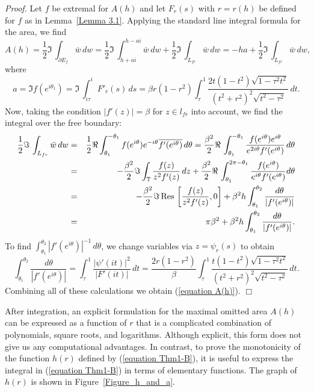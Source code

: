 \documentclass[mn,a4paper,fleqn]{w-art}
\newcommand{\be}{\begin{equation}}
\newcommand{\ee}{\end{equation}}
\newcommand{\T}{{\mathbb T}}
\begin{document}
{{\textit{Proof.}} Let $f$ be extremal for $A(h)$ and let $F_r(s)$
with $r=r(h)$ be defined for $f$ as in Lemma~\ref{Lemma 3.1}.
Applying the standard line integral formula for the area, we find  %
$$  %
A(h)=\frac12 \Im\,\int_{\partial E_f} \bar w\,dw =\frac12 \Im\,
\int_{h+ai}^{h-ai}\bar w\,dw +\frac12 \Im\, \int_{L_{fr}}\bar
w\,dw
 = -ha + \frac12 \Im\, \int_{L_{fr}}\bar w\,dw ,
$$  %
 where %
\be  \label{equation a}  %
a=\Im f(e^{i\theta_1})=\Im\, \int_{i\tau}^i F'_r(s)\, ds = \beta
r(1-r^2) \int_{\tau}^1 \frac{2t(1-t^2)\sqrt{1-\tau^2 t^2
}}{(t^2+r^2)^2\sqrt{t^2-\tau^2 }} \, dt.  %
\ee  %
Now, taking the condition $|f'(z)|=\beta$ for $z\in l_{fr}$ into
account, we find the integral over the free boundary:
\begin{eqnarray*}
\frac12 \Im\, \int_{L_{fr}}\bar w\,dw &=& \frac12 \Re
\int_{\theta_1}^{-\theta_1} f(e^{i\theta})e^{-i\theta}
{\overline{f'(e^{i\theta})}}\,d\theta = \frac{\beta^2}{2}
\Re\,\int _{\theta_1}^{-\theta_1}\frac{f(e^{i\theta})e^{i\theta}}{e^{2i\theta}f'(e^{i\theta})}\,d\theta \\
  &=& -\frac{\beta^2}{2} \Im\int_{\T}\frac{f(z)}{z^2 f'(z)}\,dz+
   \frac{\beta^2}{2}\Re\,\int_{\theta_1}^{2\pi-\theta_1} \frac{f(e^{i\theta})}{e^{i\theta}f'(e^{i\theta})}d\theta \\
 &=& -\frac{\beta^2}{2} \Im \,{\rm{Res}}\,\left[ \frac{f(z)}{z^2f'(z)},0 \right] +
 \beta^2 h \int_{\theta_1}^{\theta_2}\frac{d\theta}{|f'(e^{i\theta})|} \\
 &=& \pi \beta^2 + \beta^2 h \int_{\theta_1}^{\theta_2}\frac{d\theta}{|f'(e^{i\theta})|}.
\end{eqnarray*}
To find
$\int_{\theta_1}^{\theta_2}|f'(e^{i\theta})|^{-1}\,d\theta$, we
change variables via $z=\psi_r(s)$ to obtain %
$$  %
\int_{\theta_1}^{\theta_2}\frac{d\theta}{|f'(e^{i\theta})|} =
\int_{\tau}^1 \frac{|\psi'(it)|^2}{|F'(it)|} \,  dt =
\frac{2r(1-r^2)}{\beta}\int_{\tau}^1 \frac{t(1-t^2)\sqrt{1-\tau^2
t^2 }}{(t^2+r^2)^2\sqrt{t^2-\tau^2 }} \, dt.  %
$$  %
Combining all of these calculations we obtain (\ref{equation A(h)}). \hfill $\Box$

\smallskip

 After integration, an explicit formulation for the maximal
omitted area $A(h)$ can be expressed as a function of
$r$ that is a complicated combination of polynomials, square
roots, and logarithms. Although explicit, this form does not give
us any computational advantages. In contrast, to prove the
monotonicity of the function $h(r)$ defined by (\ref{equation
Thm1-B}), it is useful to express the integral in (\ref{equation
Thm1-B}) in terms of elementary functions. The graph of $h(r)$ is shown in
Figure~\ref{Figure_h_and_a}.



}
\end{document}
